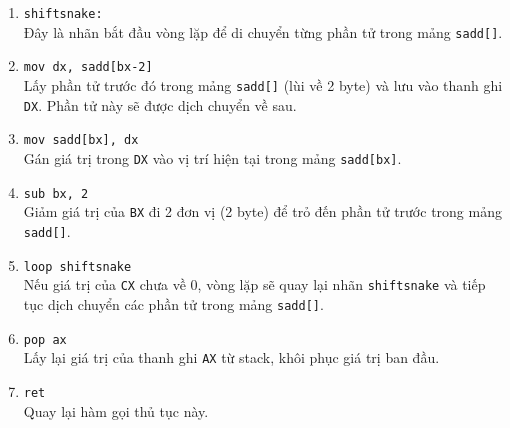 \documentclass[12pt]{article}
\begin{document}
\begin{enumerate}[label=\textbf{\arabic*.}]
    \item \texttt{shiftsnake:} \\
    Đây là nhãn bắt đầu vòng lặp để di chuyển từng phần tử trong mảng \texttt{sadd[]}.
    
    \item \texttt{mov dx, sadd[bx-2]} \\
    Lấy phần tử trước đó trong mảng \texttt{sadd[]} (lùi về 2 byte) và lưu vào thanh ghi \texttt{DX}. Phần tử này sẽ được dịch chuyển về sau.

    \item \texttt{mov sadd[bx], dx} \\
    Gán giá trị trong \texttt{DX} vào vị trí hiện tại trong mảng \texttt{sadd[bx]}.

    \item \texttt{sub bx, 2} \\
    Giảm giá trị của \texttt{BX} đi 2 đơn vị (2 byte) để trỏ đến phần tử trước trong mảng \texttt{sadd[]}.

    \item \texttt{loop shiftsnake} \\
    Nếu giá trị của \texttt{CX} chưa về 0, vòng lặp sẽ quay lại nhãn \texttt{shiftsnake} và tiếp tục dịch chuyển các phần tử trong mảng \texttt{sadd[]}. 

    \item \texttt{pop ax} \\
    Lấy lại giá trị của thanh ghi \texttt{AX} từ stack, khôi phục giá trị ban đầu.

    \item \texttt{ret} \\
    Quay lại hàm gọi thủ tục này.
\end{enumerate}
\end{document}
